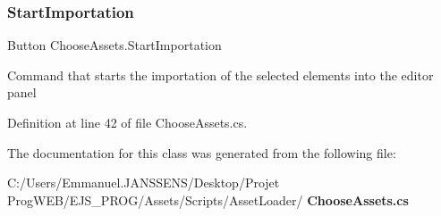 \subsubsection{Start\+Importation}
{\footnotesize\ttfamily Button Choose\+Assets.\+Start\+Importation}



Command that starts the importation of the selected elements into the editor panel 



Definition at line 42 of file Choose\+Assets.\+cs.



The documentation for this class was generated from the following file\+:\begin{DoxyCompactItemize}
\item 
C\+:/\+Users/\+Emmanuel.\+J\+A\+N\+S\+S\+E\+N\+S/\+Desktop/\+Projet Prog\+W\+E\+B/\+E\+J\+S\+\_\+\+P\+R\+O\+G/\+Assets/\+Scripts/\+Asset\+Loader/\textbf{ Choose\+Assets.\+cs}\end{DoxyCompactItemize}
